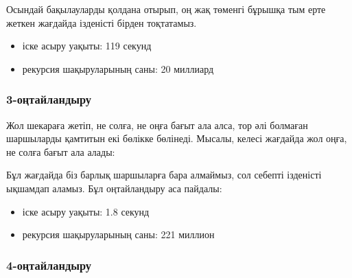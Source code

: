 \begin{center}
\end{center}
Осындай бақылауларды қолдана отырып, оң жақ төменгі бұрышқа
тым ерте жеткен жағдайда ізденісті бірден тоқтатамыз.
\begin{itemize}
\item
іске асыру уақыты: 119 секунд
\item
рекурсия шақыруларының саны: 20 миллиард
\end{itemize}

\subsubsection{3-оңтайландыру}
    
Жол шекараға жетіп, не солға, не оңға 
бағыт ала алса, тор әлі болмаған шаршыларды қамтитын
екі бөлікке бөлінеді.
Мысалы, келесі жағдайда жол оңға, не солға бағыт ала алады:

\begin{center}
\end{center}
Бұл жағдайда біз барлық шаршыларға бара алмаймыз,
сол себепті ізденісті ықшамдап аламыз.
Бұл оңтайландыру аса пайдалы:

\begin{itemize}
\item
іске асыру уақыты: 1.8 секунд
\item
рекурсия шақыруларының саны: 221 миллион
\end{itemize} 

\subsubsection{4-оңтайландыру}

